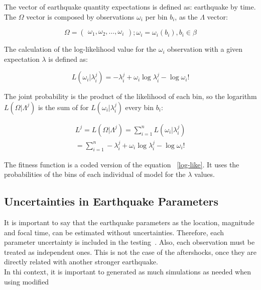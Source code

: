 The vector of earthquake quantity expectations is defined as:
earthquake by time. The $\Omega$ vector is composed by observations
$\omega_i$ per bin $b_i$, as the $\Lambda$ vector:

\begin{equation}
\Omega = 
\begin{pmatrix}
    \omega_1,
    \omega_2,
    \hdots,
    \omega_i
  \end{pmatrix}
  ;\omega_i =\omega_i(b_i),b_i \in \beta
\end{equation}

The calculation of the log-likelihood value for the $\omega_i$
observation with a given expectation $\lambda$ is defined as:


\begin{equation}
	L(\omega_i|\lambda_i^j) = -\lambda_i^j + \omega_i\log\lambda_i^j - \log\omega_i!
\end{equation}

The joint probability is the product of the likelihood of each bin, so
the logarithm $L(\Omega|\Lambda^j)$ is the sum of for
$L(\omega_i|\lambda_i^j)$ every bin $b_i$:

\begin{equation}\label{log-like}
\begin{split}
	L^j = L(\Omega|\Lambda^j) = \sum_{i=1}^{n}L(\omega_i|\lambda_i^j)  \\
	= \sum_{i=1}^{n} -\lambda_i^j + \omega_i\log\lambda_i^j - \log\omega_i!  
\end{split}
\end{equation}

The fitness function is a coded version of the equation
~\ref{log-like}. It uses the probabilities of the bins of each
individual of model for the $\lambda$ values.
				
\subsection{Uncertainties in Earthquake Parameters}
It is important to say that the earthquake parameters as the location, magnitude and focal time, can be estimated without uncertainties. Therefore, each parameter uncertainty is included in the testing~\cite{schorlemmer2007earthquake}. Also, each observation must be treated as independent ones. This is not the case of the aftershocks, once they are directly related with another stronger earthquake. \\

In thi context, it is important to generated as much simulations as needed when using modified 

